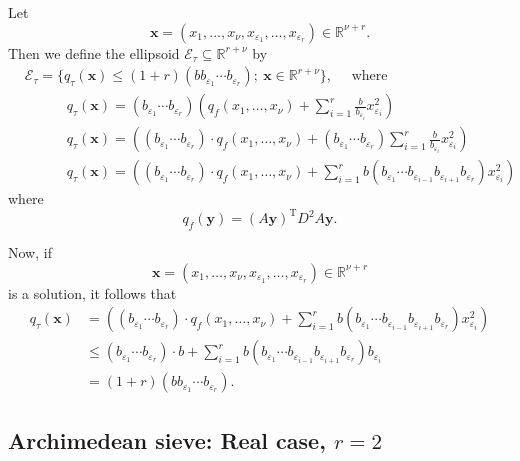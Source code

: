 Let
\[\mathbf{x} = (x_1, \dots, x_{\nu}, x_{\varepsilon_1}, \dots, x_{\varepsilon_{r}}) \in \mathbb{R}^{\nu + r}.\]
Then we define the ellipsoid $\mathcal{E_\tau}\subseteq \mathbb{R}^{r+\nu}$ by
\begin{align*}\label{def:ellreal}
& \mathcal{E_\tau}=\{q_\tau(\mathbf{x})\leq (1 + r)(bb_{\varepsilon_1}\cdots b_{\varepsilon_r}); \ \mathbf{x}\in\mathbb{R}^{r+\nu}\}, \quad \text{ where }\\
&\quad \quad \quad q_{\tau}(\mathbf{x})= (b_{\varepsilon_1}\cdots b_{\varepsilon_r})\left( q_f(x_1, \dots, x_{\nu}) + \sum_{i = 1}^r\frac{b}{b_{\varepsilon_i}}x_{\varepsilon_i}^2\right)\\
&\quad \quad \quad q_{\tau}(\mathbf{x})=\left((b_{\varepsilon_1}\cdots b_{\varepsilon_r})\cdot q_f(x_1, \dots, x_{\nu}) + (b_{\varepsilon_1}\cdots b_{\varepsilon_r})\sum_{i = 1}^r\frac{b}{b_{\varepsilon_i}}x_{\varepsilon_i}^2\right)\\
&\quad \quad \quad q_{\tau}(\mathbf{x})=\left((b_{\varepsilon_1}\cdots b_{\varepsilon_r})\cdot q_f(x_1, \dots, x_{\nu}) + \sum_{i = 1}^rb(b_{\varepsilon_1}\cdots b_{\varepsilon_{i-1}}b_{\varepsilon_{i+1}}b_{\varepsilon_r})x_{\varepsilon_i}^2\right)
\end{align*}
where
\[q_f(\mathbf{y}) = (A\mathbf{y})^{\text{T}}D^2A\mathbf{y}.\]

Now, if 
\[\mathbf{x} = (x_1, \dots, x_{\nu}, x_{\varepsilon_1}, \dots, x_{\varepsilon_{r}}) \in \mathbb{R}^{\nu + r}\]
is a solution, it follows that
\begin{align*}
q_{\tau}(\mathbf{x})
	& =\left((b_{\varepsilon_1}\cdots b_{\varepsilon_r})\cdot q_f(x_1, \dots, x_{\nu}) + \sum_{i = 1}^rb(b_{\varepsilon_1}\cdots b_{\varepsilon_{i-1}}b_{\varepsilon_{i+1}}b_{\varepsilon_r})x_{\varepsilon_i}^2\right)\\
	& \leq (b_{\varepsilon_1}\cdots b_{\varepsilon_r})\cdot b + \sum_{i = 1}^rb(b_{\varepsilon_1}\cdots b_{\varepsilon_{i-1}}b_{\varepsilon_{i+1}}b_{\varepsilon_r})b_{\varepsilon_i}\\
	& = (1+r)(bb_{\varepsilon_1}\cdots b_{\varepsilon_r}).
\end{align*}

\subsection{Archimedean sieve: Real case, $r = 2$}

